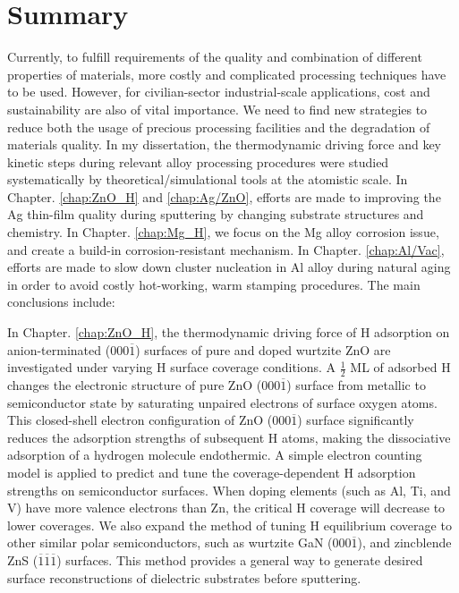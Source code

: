 \section{Summary}

Currently, to fulfill requirements of the quality and combination of different properties of materials, more costly and complicated processing techniques have to be used. However, for civilian-sector industrial-scale applications, cost and sustainability are also of vital importance. We need to find new strategies to reduce both the usage of precious processing facilities and the degradation of materials quality. In my dissertation, the thermodynamic driving force and key kinetic steps during relevant alloy processing procedures were studied systematically by theoretical/simulational tools at the atomistic scale. In Chapter. \ref{chap:ZnO_H} and \ref{chap:Ag/ZnO}, efforts are made to improving the Ag thin-film quality during sputtering by changing substrate structures and chemistry. In Chapter. \ref{chap:Mg_H}, we focus on the Mg alloy corrosion issue, and create a build-in corrosion-resistant mechanism.
In Chapter. \ref{chap:Al/Vac}, efforts are made to slow down cluster nucleation in Al alloy during natural aging in order to avoid costly hot-working, warm stamping procedures. The main conclusions include:

In Chapter. \ref{chap:ZnO_H}, the thermodynamic driving force of H adsorption on anion-terminated (000$\overline{1}$) surfaces of pure and doped wurtzite ZnO are investigated under varying H surface coverage conditions. A $\frac{1}{2}$ \ac{ML} of adsorbed H changes the electronic structure of pure ZnO (000$\overline{1}$) surface from metallic to semiconductor state by saturating unpaired electrons of surface oxygen atoms. This closed-shell electron configuration of ZnO (000$\overline{1}$) surface significantly reduces the adsorption strengths of subsequent H atoms, making the dissociative adsorption of a hydrogen molecule endothermic. A simple electron counting model is applied to predict and tune the coverage-dependent H adsorption strengths on semiconductor surfaces. When doping elements (such as Al, Ti, and V) have more valence electrons than Zn, the critical H coverage will decrease to lower coverages. We also expand the method of tuning H equilibrium coverage to other similar polar semiconductors, such as wurtzite GaN (000$\overline{1}$), and zincblende ZnS ($\overline{1}$$\overline{1}$$\overline{1}$) surfaces. This method provides a general way to generate desired surface reconstructions of dielectric substrates before sputtering.

